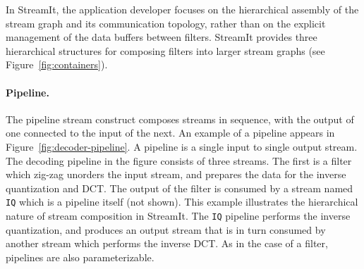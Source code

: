 \begin{figure}[t]
\end{figure}

In StreamIt, the application developer focuses on the hierarchical
assembly of the stream graph and its communication topology, rather
than on the  explicit management of the data buffers between filters.
StreamIt provides three hierarchical structures for composing filters
into larger stream graphs (see Figure~\ref{fig:containers}).

\paragraph{Pipeline.}
The pipeline stream construct composes streams in sequence, with
the output of one connected to the input of the next.  An example of a
pipeline appears in Figure~\ref{fig:decoder-pipeline}. A pipeline is a
single input to single output stream. The decoding pipeline in the
figure consists of three streams. The first is a filter which zig-zag
unorders the input stream, and prepares the data for the inverse
quantization and DCT. The output of the filter is consumed by a stream
named {\tt IQ} which is a pipeline itself (not shown). This example
illustrates the hierarchical nature of stream composition in
StreamIt. The {\tt IQ} pipeline performs the inverse quantization, and
produces an output stream that is in turn consumed by another stream
which performs the inverse DCT. As in the case of a filter, pipelines
are also parameterizable.

